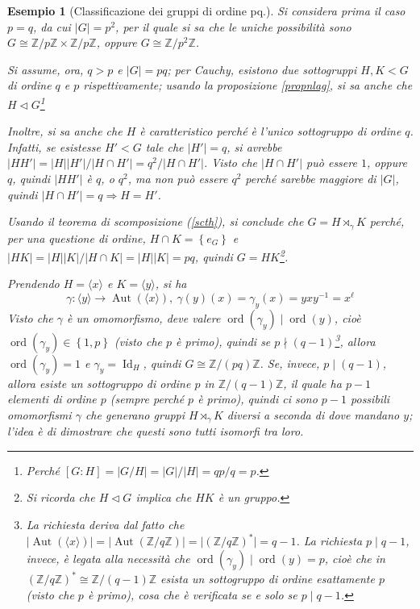 \documentclass[12pt]{scrartcl}
\theoremstyle{style}
\newtheorem{esempio}{Esempio}[section]
\numberwithin{equation}{subsection}
\begin{document}
\begin{esempio}
	[Classificazione dei gruppi di ordine pq.]
	Si considera prima il caso $p=q$, da cui $\lvert G \rvert  = p^2$, per il quale si sa che le uniche possibilit\`a sono $G \cong \mathbb{Z}/p\mathbb{Z} \times \mathbb{Z} / p \mathbb{Z}$, oppure $G\cong\mathbb{Z} / p ^2 \mathbb{Z}$.

	Si assume, ora, $q>p$ e $\lvert G \rvert = pq$; per Cauchy, esistono due sottogruppi $H,K < G$ di ordine $q$ e $p$ rispettivamente; usando la proposizione \ref{propnlag}, si sa anche che $H \lhd G$\footnote{Perch\'e $[G:H] = \lvert G / H \rvert = \lvert G  \rvert / \lvert H \rvert = qp / q =p $.}
	
	Inoltre, si sa anche che $H$ \`e caratteristico perch\'e \`e l'unico sottogruppo di ordine $q$. 
	Infatti, se esistesse $H'<G$ tale che $\lvert H' \rvert =q$, si avrebbe $\lvert H H' \rvert = \lvert H \rvert \lvert H' \rvert  / \lvert H \cap H' \rvert = q^2 / \lvert H\cap H' \rvert $. 
	Visto che $\lvert H\cap H' \rvert $ pu\`o essere $1$, oppure $q$, quindi $\lvert H H' \rvert $ \`e $q$, o $q^2$, ma non pu\`o essere $q^2 $ perch\'e sarebbe maggiore di $\lvert G \rvert $, quindi $\lvert H\cap H' \rvert = q \Rightarrow H = H'$.

	Usando il teorema di scomposizione (\ref{scth}), si conclude che $G = H \rtimes _\gamma K$ perch\'e, per una questione di ordine, $H\cap K = \left\{ e_G \right\} $ e $\lvert HK \rvert = \lvert H \rvert \lvert K \rvert / \lvert H\cap K \rvert = \lvert H  \rvert \lvert K \rvert =pq$, quindi $G = HK$\footnote{Si ricorda che $H\lhd G$ implica che $HK$ \`e un gruppo.}.

	Prendendo $H = \langle x \rangle$ e $ K = \langle y \rangle$, si ha
	\[
	\gamma : \langle y \rangle \longrightarrow \operatorname{Aut} (\langle x \rangle),  \ \gamma(y)(x) = \gamma_y(x) = yxy^{-1}= x^\ell 
	\] 
	Visto che $\gamma$ \`e un omomorfismo, deve valere $\operatorname{ord}(\gamma_y)  \mid \operatorname{ord}(y) $, cio\`e $\operatorname{ord}(\gamma_y) \in \left\{ 1,p \right\} $ (visto che $p$ \`e primo), quindi se $p  \nmid  (q - 1)$\footnote{La richiesta deriva dal fatto che $\lvert \operatorname{Aut} (\langle x \rangle) \rvert = \lvert \operatorname{Aut} (\mathbb{Z}/q\mathbb{Z}) \rvert =\lvert (\mathbb{Z}/q\mathbb{Z})^* \rvert = q - 1$. La richiesta $p  \mid q-1$, invece, \`e legata alla necessit\`a che $\operatorname{ord}(\gamma_y)  \mid \operatorname{ord}(y) =p$, cio\`e che in $(\mathbb{Z}/q\mathbb{Z})^*\cong \mathbb{Z}/(q-1)\mathbb{Z}$ esista un sottogruppo di ordine esattamente $p$ (visto che $p$ \`e primo), cosa che \`e verificata se e solo se $p  \mid q-1$.}, allora $\operatorname{ord}(\gamma_y) =1$ e $\gamma_y = \operatorname{Id} _H$, quindi $G \cong \mathbb{Z}/(pq) \mathbb{Z}$.
	Se, invece, $p \mid (q-1)$, allora esiste un sottogruppo di ordine $p$ in $\mathbb{Z}/(q-1)\mathbb{Z}$, il quale ha $p-1$ elementi di ordine $p$ (sempre perch\'e $p$ \`e primo), quindi ci sono $p-1$ possibili omomorfismi $\gamma$ che generano gruppi $H \rtimes _\gamma K$ diversi a seconda di dove mandano $y$; l'idea \`e di dimostrare che questi sono tutti isomorfi tra loro.


\end{esempio}
\end{document}
